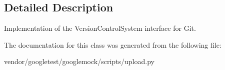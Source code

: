\subsection{Detailed Description}
\begin{DoxyVerb}Implementation of the VersionControlSystem interface for Git.\end{DoxyVerb}
 

The documentation for this class was generated from the following file\+:\begin{DoxyCompactItemize}
\item 
vendor/googletest/googlemock/scripts/upload.\+py\end{DoxyCompactItemize}
